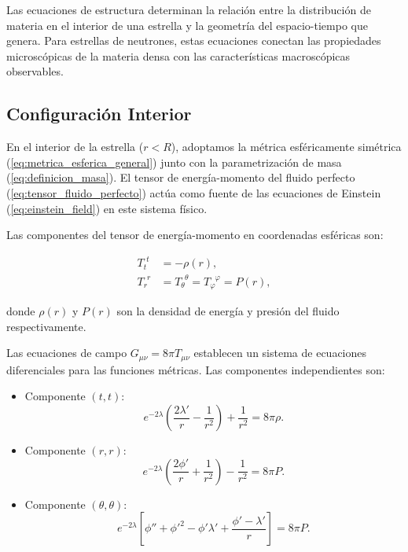 Las ecuaciones de estructura determinan la relación entre la distribución de materia en el interior de una estrella y la geometría del espacio-tiempo que genera. Para estrellas de neutrones, estas ecuaciones conectan las propiedades microscópicas de la materia densa con las características macroscópicas observables.

\subsection{Configuración Interior}

En el interior de la estrella ($r < R$), adoptamos la métrica esféricamente simétrica (\ref{eq:metrica_esferica_general}) junto con la parametrización de masa (\ref{eq:definicion_masa}). El tensor de energía-momento del fluido perfecto (\ref{eq:tensor_fluido_perfecto}) actúa como fuente de las ecuaciones de Einstein (\ref{eq:einstein_field}) en este sistema físico.

Las componentes del tensor de energía-momento en coordenadas esféricas son:

\begin{align}
	T_t^{\phantom{t}t} &= -\rho(r), \\
	T_r^{\phantom{r}r} &= T_\theta^{\phantom{\theta}\theta} = T_\varphi^{\phantom{\varphi}\varphi} = P(r),
\end{align}

donde $\rho(r)$ y $P(r)$ son la densidad de energía y presión del fluido respectivamente.

Las ecuaciones de campo $G_{\mu\nu} = 8\pi T_{\mu\nu}$ establecen un sistema de ecuaciones diferenciales para las funciones métricas. Las componentes independientes son:

\begin{itemize}
	\item Componente $(t,t)$:
	\begin{equation}
		e^{-2\lambda}\left(\frac{2\lambda'}{r} - \frac{1}{r^2}\right) + \frac{1}{r^2} = 8\pi\rho.
		\label{eq:einstein_tt}
	\end{equation}
	\item Componente $(r,r)$:
	\begin{equation}
		e^{-2\lambda}\left(\frac{2\phi'}{r} + \frac{1}{r^2}\right) - \frac{1}{r^2} = 8\pi P.
		\label{eq:einstein_rr}
	\end{equation}
	\item Componente $(\theta,\theta)$:
	\begin{equation}
		e^{-2\lambda}\left[\phi'' + \phi'^2 - \phi'\lambda' + \frac{\phi' - \lambda'}{r}\right] = 8\pi P.
		\label{eq:einstein_theta}
	\end{equation}
\end{itemize}

